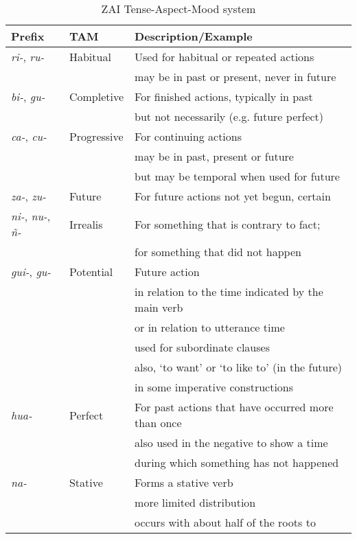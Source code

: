 \begin{table}[htp]
\begin{center}
\begin{tabularx}{\textwidth}{l l l}\hline
 Prefix & TAM & Description/Example \\
 \hline
\textit{ri-}, \textit{ru-} & Habitual & Used for habitual or repeated actions \\
 & & may be in past or present, never in future \\
 \hline
\textit{bi-}, \textit{gu-} & Completive & For finished actions, typically in past \\
 & & but not necessarily (e.g. future perfect) \\
 \hline
\textit{ca-}, \textit{cu-} &  Progressive & For continuing actions \\
 & & may be in past, present or future \\
  & & but may be temporal when used for future \\
  \hline 
 \textit{za-}, \textit{zu-} & Future & For future actions not yet begun, certain \\
 \hline
 \textit{ni-}, \textit{nu-}, \textit{\~{n}-} & Irrealis & For something that is contrary to fact; \\
 & & for something that did not happen \\
 \hline
\textit{gui-}, \textit{gu-} & Potential & Future action \\
 & & in relation to the time indicated by the main verb \\
 & & or in relation to utterance time \\
 & & used for subordinate clauses \\
  & & also, `to want' or `to like to' (in the future) \\
 & & in some imperative constructions \\
 \hline
\textit{hua-} & Perfect & For past actions that have occurred more than once \\
 & & also used in the negative to show a time \\
  & & during which something has not happened \\
  \hline
\textit{na-} & Stative & Forms a stative verb \\
& & more limited distribution \\
 & & occurs with about half of the roots to  \\
  \hline
 \end{tabularx}
\caption{\small{ZAI Tense-Aspect-Mood system}}
\label{TAMsystem}
\end{center}
\end{table} 


